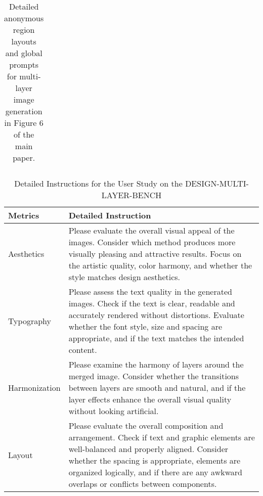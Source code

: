 \begin{table*}[t]
\begin{tabular}{|m{}|m{}|m{}|}
    \end{tabular}
    \vspace{-1mm}
    \caption{Detailed anonymous region layouts and global prompts for multi-layer image generation in Figure 6 of the main paper.}
    \label{tab:generation_results_2}
\end{table*}
\newpage





\begin{table*}[t]
\centering
\begin{minipage}{\textwidth}
    \centering
    \small
    \begin{tabular}{p{}|p{}}
    \textbf{Metrics} & \textbf{Detailed Instruction} \\
    \hline
    Aesthetics & Please evaluate the overall visual appeal of the images. Consider which method produces more visually pleasing and attractive results. Focus on the artistic quality, color harmony, and whether the style matches design aesthetics. \\
    \hline
    Typography & Please assess the text quality in the generated images. Check if the text is clear, readable and accurately rendered without distortions. Evaluate whether the font style, size and spacing are appropriate, and if the text matches the intended content. \\
    \hline
    Harmonization & Please examine the harmony of layers around the merged image. Consider whether the transitions between layers are smooth and natural, and if the layer effects enhance the overall visual quality without looking artificial. \\
    \hline
    Layout & Please evaluate the overall composition and arrangement. Check if text and graphic elements are well-balanced and properly aligned. Consider whether the spacing is appropriate, elements are organized logically, and if there are any awkward overlaps or conflicts between components. \\
    \end{tabular}
    \vspace{-1mm}
    \caption{Detailed Instructions for the User Study on the \textsc{DESIGN-MULTI-LAYER-BENCH}}
    \label{tab:user_study_prompt_1}
\end{minipage}

\vspace{5em}


\end{table*}
